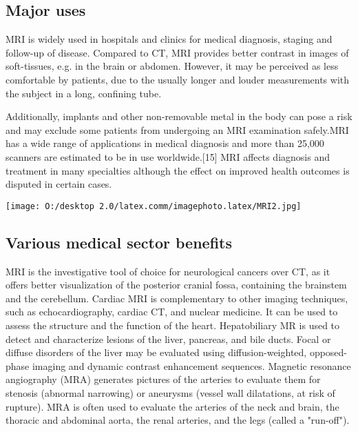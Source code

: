 \documentclass[12pt]{article}
\begin{document}
\subsection{Major uses}

MRI is widely used in hospitals and clinics for medical diagnosis, staging and follow-up of disease. Compared to CT, MRI provides better contrast in images of soft-tissues, e.g. in the brain or abdomen. However, it may be perceived as less comfortable by patients, due to the usually longer and louder measurements with the subject in a long, confining tube.

 Additionally, implants and other non-removable metal in the body can pose a risk and may exclude some patients from undergoing an MRI examination safely.MRI has a wide range of applications in medical diagnosis and more than 25,000 scanners are estimated to be in use worldwide.[15] MRI affects diagnosis and treatment in many specialties although the effect on improved health outcomes is disputed in certain cases.

\texttt{[image: O:/desktop 2.0/latex.comm/imagephoto.latex/MRI2.jpg]}

 
\subsection{Various medical sector benefits}

MRI is the investigative tool of choice for neurological cancers over CT, as it offers better visualization of the posterior cranial fossa, containing the brainstem and the cerebellum.\newline
 \indent Cardiac MRI is complementary to other imaging techniques, such as echocardiography, cardiac CT, and nuclear medicine. It can be used to assess the structure and the function of the heart.\newline 
 \indent Hepatobiliary MR is used to detect and characterize lesions of the liver, pancreas, and bile ducts. Focal or diffuse disorders of the liver may be evaluated using diffusion-weighted, opposed-phase imaging and dynamic contrast enhancement sequences.\newline 
 \indent Magnetic resonance angiography (MRA) generates pictures of the arteries to evaluate them for stenosis (abnormal narrowing) or aneurysms (vessel wall dilatations, at risk of rupture). MRA is often used to evaluate the arteries of the neck and brain, the thoracic and abdominal aorta, the renal arteries, and the legs (called a "run-off"). 
\end{document}
